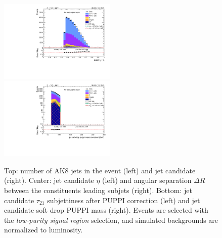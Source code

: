 \begin{figure}[!htb]
\begin{center}
    \includegraphics[width=0.495\textwidth]{plots/v9_thesis/XVZnnlpSR/FatJet1_puppiTau21.pdf}
    \includegraphics[width=0.495\textwidth]{plots/v9_thesis/XVZnnlpSR/FatJet1_softdropPuppiMassCorr.pdf}

    \caption{Top: number of AK8 jets in the event (left) and \V jet candidate \pt (right). Center: \V jet candidate $\eta$ (left) and angular separation $\Delta R$ between the constituents leading subjets (right). Bottom: \V jet candidate $\tau_{21}$ subjettiness after PUPPI correction (left) and \V jet candidate soft drop PUPPI mass (right). Events are selected with the \emph{low-purity signal region} selection, and simulated backgrounds are normalized to luminosity.}
  \end{center}
\end{figure}

\clearpage

